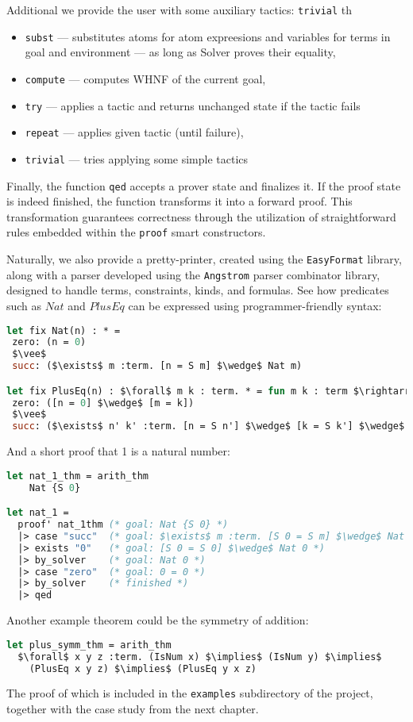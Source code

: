 \documentclass[english, mgr]{iithesis}
\renewcommand{\tt}[1]{\texttt{\small{#1}}}
\begin{document}
Additional we provide the user with some auxiliary tactics:
\tt{trivial} th
\begin{itemize}
\item \tt{subst} --- substitutes atoms for atom expreesions
  and variables for terms in goal and environment
  --- as long as Solver proves their equality,
\item \tt{compute} --- computes WHNF of the current goal,
\item \tt{try} --- applies a tactic and returns unchanged state if the tactic fails
\item \tt{repeat} --- applies given tactic (until failure),
\item \tt{trivial} ---  tries applying some simple tactics
\end{itemize}
Finally, the function \texttt{qed} accepts a prover state and finalizes it.
If the proof state is indeed finished, the function transforms it into a forward proof.
This transformation guarantees correctness through the utilization of straightforward rules embedded within the \tt{proof} smart constructors.

Naturally, we also provide a pretty-printer, created using the \texttt{EasyFormat} library,
along with a parser developed using the \texttt{Angstrom} parser combinator library,
designed to handle terms, constraints, kinds, and formulas.
See how predicates such as $Nat$ and $PlusEq$ can be expressed using
programmer-friendly syntax:
\begin{lstlisting}[mathescape, language=OCaml]
let fix Nat(n) : * =
 zero: (n = 0)
 $\vee$
 succ: ($\exists$ m :term. [n = S m] $\wedge$ Nat m)

let fix PlusEq(n) : $\forall$ m k : term. * = fun m k : term $\rightarrow$
 zero: ([n = 0] $\wedge$ [m = k])
 $\vee$
 succ: ($\exists$ n' k' :term. [n = S n'] $\wedge$ [k = S k'] $\wedge$ PlusEq n' m k')
\end{lstlisting}
And a short proof that 1 is a natural number:
\begin{lstlisting}[mathescape, language=OCaml]
let nat_1_thm = arith_thm
    Nat {S 0}

let nat_1 =
  proof' nat_1thm (* goal: Nat {S 0} *)
  |> case "succ"  (* goal: $\exists$ m :term. [S 0 = S m] $\wedge$ Nat m *)
  |> exists "0"   (* goal: [S 0 = S 0] $\wedge$ Nat 0 *)
  |> by_solver    (* goal: Nat 0 *)
  |> case "zero"  (* goal: 0 = 0 *)
  |> by_solver    (* finished *)
  |> qed
\end{lstlisting}
Another example theorem could be the symmetry of addition:
\begin{lstlisting}[mathescape, language=OCaml]
let plus_symm_thm = arith_thm
  $\forall$ x y z :term. (IsNum x) $\implies$ (IsNum y) $\implies$
    (PlusEq x y z) $\implies$ (PlusEq y x z)
\end{lstlisting}
The proof of which is included in the \tt{examples} subdirectory of the project,
together with the case study from the next chapter.
\end{document}
